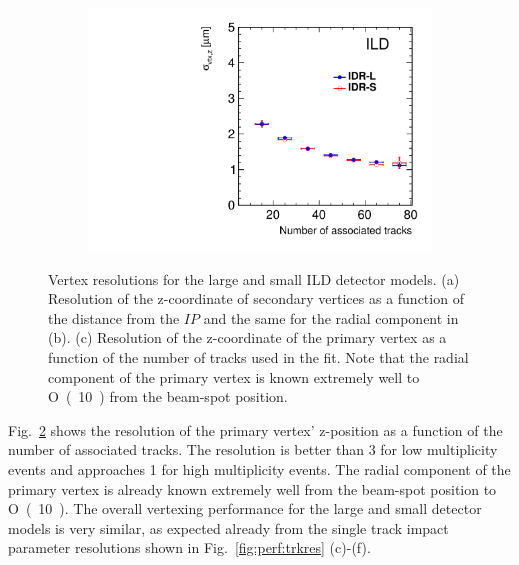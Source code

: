 \begin{figure}[htbp]
\begin{subfigure}{0.49\hsize}
 \caption{  \label{fig:perf:svtx_z}}
 \end{subfigure}
\begin{subfigure}{0.49\hsize}
 \includegraphics[width=\hsize]{Performance/fig/pvtx_z_resol.pdf}
 \caption{  \label{fig:perf:pvtx_z}}
 \end{subfigure}
\caption{ Vertex resolutions for the large and small ILD detector models.
  (a) Resolution of the z-coordinate of secondary vertices as a function of the distance from the $IP$ and the same for the radial component in (b).
  (c) Resolution of the z-coordinate of the primary vertex as a function of the number of tracks used in the fit. 
  Note that the radial component of the primary vertex is known extremely well to \unit{O(10)}{\nm} from the beam-spot position.
}
\label{fig:perf:vtxres}
\end{figure}
%
Fig.~\ref{fig:perf:pvtx_z} shows the resolution of the primary vertex' z-position as a function of the number of associated tracks.
The resolution is better than \unit{3}{\micron} for low multiplicity events and
approaches \unit{1}{\micron} for high multiplicity events.  The radial component of the primary vertex is already known
extremely well from the beam-spot position to \unit{O(10)}{\nm}. The overall vertexing performance for the large and small detector models
is very similar, as expected already from the single track impact parameter resolutions shown in Fig.~\ref{fig:perf:trkres} (c)-(f).



